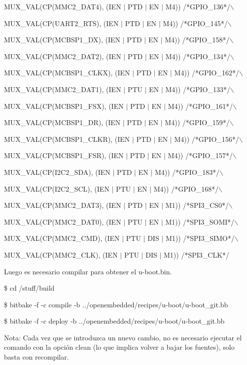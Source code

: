 MUX\_VAL(CP(MMC2\_DAT4),	(IEN  $|$ PTD $|$ EN  $|$ M4)) /*GPIO\_136*/$\backslash$  

MUX\_VAL(CP(UART2\_RTS),	(IEN  $|$ PTD $|$ EN  $|$ M4)) /*GPIO\_145*/$\backslash$  

MUX\_VAL(CP(MCBSP1\_DX),	(IEN  $|$ PTD $|$ EN  $|$ M4)) /*GPIO\_158*/$\backslash$  

MUX\_VAL(CP(MMC2\_DAT2),	(IEN  $|$ PTD $|$ EN  $|$ M4)) /*GPIO\_134*/$\backslash$  

MUX\_VAL(CP(MCBSP1\_CLKX),	(IEN  $|$ PTD $|$ EN  $|$ M4)) /*GPIO\_162*/$\backslash$  

MUX\_VAL(CP(MMC2\_DAT1),	(IEN  $|$ PTU $|$ EN  $|$ M4)) /*GPIO\_133*/$\backslash$  

MUX\_VAL(CP(MCBSP1\_FSX),	(IEN  $|$ PTD $|$ EN  $|$ M4)) /*GPIO\_161*/$\backslash$  

MUX\_VAL(CP(MCBSP1\_DR),	(IEN  $|$ PTD $|$ EN  $|$ M4)) /*GPIO\_159*/$\backslash$  

MUX\_VAL(CP(MCBSP1\_CLKR),	(IEN  $|$ PTD $|$ EN  $|$ M4)) /*GPIO\_156*/$\backslash$  

MUX\_VAL(CP(MCBSP1\_FSR),	(IEN  $|$ PTD $|$ EN  $|$ M4)) /*GPIO\_157*/$\backslash$  

MUX\_VAL(CP(I2C2\_SDA),		(IEN  $|$ PTD $|$ EN  $|$ M4)) /*GPIO\_183*/$\backslash$  

MUX\_VAL(CP(I2C2\_SCL),		(IEN  $|$ PTU $|$ EN  $|$ M4)) /*GPIO\_168*/$\backslash$  

MUX\_VAL(CP(MMC2\_DAT3),	(IEN  $|$ PTD $|$ EN  $|$ M1)) /*SPI3\_CS0*/$\backslash$  

MUX\_VAL(CP(MMC2\_DAT0),	(IEN  $|$ PTU $|$ EN  $|$ M1)) /*SPI3\_SOMI*/$\backslash$  

MUX\_VAL(CP(MMC2\_CMD),		(IEN  $|$ PTU $|$ DIS $|$ M1)) /*SPI3\_SIMO*/$\backslash$  

MUX\_VAL(CP(MMC2\_CLK),		(IEN  $|$ PTU $|$ DIS $|$ M1)) /*SPI3\_CLK*/

\bigskip
Luego es necesario compilar para obtener el u-boot.bin.

\bigskip
\centerline{\$ cd /stuff/build}

\centerline{\$ bitbake -f -c compile -b ../openembedded/recipes/u-boot/u-boot\_git.bb}

\centerline{\$ bitbake -f -c deploy -b ../openembedded/recipes/u-boot/u-boot\_git.bb}

\bigskip
Nota: Cada vez que se introduzca un nuevo cambio, no es necesario ejecutar el comando con la opción clean (lo que implica volver a bajar los fuentes), solo basta con recompilar.

